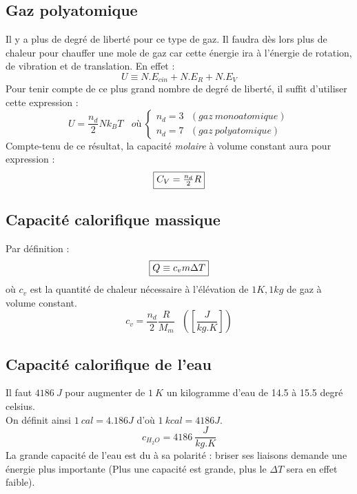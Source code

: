 \documentclass	[11pt, a4paper, openany]{book}
\begin{document}
\subsection{Gaz polyatomique}
Il y a plus de degré de liberté pour ce type de gaz. Il faudra dès lors plus de chaleur pour chauffer une mole de gaz car cette énergie ira à l'énergie de rotation, de vibration et de translation. En effet :
\begin{equation}
U \equiv N.E_{cin} + N.E_R + N.E_V
\end{equation}
Pour tenir compte de ce plus grand nombre de degré de liberté, il suffit d'utiliser cette expression :
\begin{equation}
U = \frac{n_d}{2}Nk_BT\ \ \ \ où \ \left\{\begin{array}{l}
n_d = 3 \ \ \ (gaz\ monoatomique)\\
n_d = 7 \ \ \ (gaz\ polyatomique)
\end{array}\right.
\end{equation}
Compte-tenu de ce résultat, la capacité \textit{molaire} à volume constant aura pour expression :
\begin{equation}
\fbox{$ C_V = \frac{n_d}{2}R$}
\end{equation}

\subsection{Capacité calorifique massique}
Par définition :
\begin{equation}
\fbox{$ Q \equiv c_v m \Delta T$}
\end{equation}
où $c_v$ est la quantité de chaleur nécessaire à l'élévation de $1K, 1kg$ de gaz à volume constant.
\begin{equation}
c_v = \frac{n_d}{2}\frac{R}{M_m}\ \ \ \left(\left[\frac{J}{kg.K}\right]\right)
\end{equation}

\subsection{Capacité calorifique de l'eau}
Il faut $4186\ J$ pour augmenter de $1\ K$ un kilogramme d'eau de 14.5 à 15.5 degré celsius.\\
On définit ainsi $1\ cal = 4.186J$ d'où $1\ kcal = 4186J$.
\begin{equation}
c_{H_2O} = 4186\ \frac{J}{kg.K}
\end{equation}
La grande capacité de l'eau est du à sa polarité : briser ses liaisons demande une énergie plus importante (Plus une capacité est grande, plus le $\Delta T$ sera en effet faible).
\end{document}
